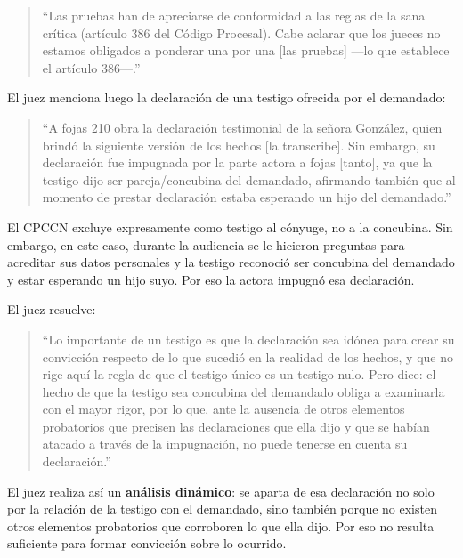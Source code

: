 \documentclass[12pt,oneside]{book}
\begin{document}
\begin{quote}
``Las pruebas han de apreciarse de conformidad a las reglas de la sana crítica (artículo 386 del Código Procesal). Cabe aclarar que los jueces no estamos obligados a ponderar una por una [las pruebas] ---lo que establece el artículo 386---.''
\end{quote}

El juez menciona luego la declaración de una testigo ofrecida por el demandado:

\begin{quote}
``A fojas 210 obra la declaración testimonial de la señora González, quien brindó la siguiente versión de los hechos [la transcribe]. Sin embargo, su declaración fue impugnada por la parte actora a fojas [tanto], ya que la testigo dijo ser pareja/concubina del demandado, afirmando también que al momento de prestar declaración estaba esperando un hijo del demandado.''
\end{quote}

El CPCCN excluye expresamente como testigo al cónyuge, no a la concubina. Sin embargo, en este caso, durante la audiencia se le hicieron preguntas para acreditar sus datos personales y la testigo reconoció ser concubina del demandado y estar esperando un hijo suyo. Por eso la actora impugnó esa declaración.

El juez resuelve:

\begin{quote}
``Lo importante de un testigo es que la declaración sea idónea para crear su convicción respecto de lo que sucedió en la realidad de los hechos, y que no rige aquí la regla de que el testigo único es un testigo nulo. Pero dice: el hecho de que la testigo sea concubina del demandado obliga a examinarla con el mayor rigor, por lo que, ante la ausencia de otros elementos probatorios que precisen las declaraciones que ella dijo y que se habían atacado a través de la impugnación, no puede tenerse en cuenta su declaración.''
\end{quote}

El juez realiza así un \textbf{análisis dinámico}: se aparta de esa declaración no solo por la relación de la testigo con el demandado, sino también porque no existen otros elementos probatorios que corroboren lo que ella dijo. Por eso no resulta suficiente para formar convicción sobre lo ocurrido.
\end{document}
